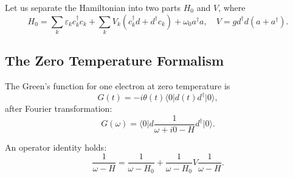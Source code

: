 \documentclass{book}
\newcommand{\bra}[1]{{\langle#1|}}
\newcommand{\ket}[1]{{|#1\rangle}}
\numberwithin{equation}{section}
\begin{document}
Let us separate the Hamiltonian into two parts $H_0$ and $V$, where
\begin{equation}
  H_0=\sum_k\varepsilon_kc_k^\dag c_k+\sum_kV_k(c_k^\dag d+d^\dag c_k)
  +\omega_0a^\dag a,\quad V=gd^\dag d(a+a^\dag).
\end{equation}

\subsection{The Zero Temperature Formalism}
The Green's function for one electron at zero temperature is
\begin{equation}
  G(t)=-i\theta(t)\bra{0}d(t)d^\dag\ket{0},
\end{equation}
after Fourier transformation:
\begin{equation}
  G(\omega)=\bra{0}d\frac{1}{\omega+i0-H}d^\dag\ket{0}.
\end{equation}
  
An operator identity holds:
\begin{equation}
  \frac{1}{\omega-H}=\frac{1}{\omega-H_0}+
  \frac{1}{\omega-H_0}V\frac{1}{\omega-H}.
\end{equation}
\end{document}
